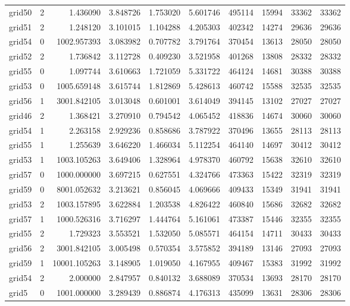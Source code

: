 \begin{longtable}{|l|r|r|r|r|r|r|r|r|r|}
grid50 & 2 & 1.436090 & 3.848726 & 1.753020 & 5.601746 & 495114 & 15994 & 33362 & 33362 \\
grid51 & 2 & 1.248120 & 3.101015 & 1.104288 & 4.205303 & 402342 & 14274 & 29636 & 29636 \\
grid54 & 0 & 1002.957393 & 3.083982 & 0.707782 & 3.791764 & 370454 & 13613 & 28050 & 28050 \\
grid52 & 2 & 1.736842 & 3.112728 & 0.409230 & 3.521958 & 401268 & 13808 & 28332 & 28332 \\
grid55 & 0 & 1.097744 & 3.610663 & 1.721059 & 5.331722 & 464124 & 14681 & 30388 & 30388 \\
grid53 & 0 & 1005.659148 & 3.615744 & 1.812869 & 5.428613 & 460742 & 15588 & 32535 & 32535 \\
grid56 & 1 & 3001.842105 & 3.013048 & 0.601001 & 3.614049 & 394145 & 13102 & 27027 & 27027 \\
grid46 & 2 & 1.368421 & 3.270910 & 0.794542 & 4.065452 & 418836 & 14674 & 30060 & 30060 \\
grid54 & 1 & 2.263158 & 2.929236 & 0.858686 & 3.787922 & 370496 & 13655 & 28113 & 28113 \\
grid55 & 1 & 1.255639 & 3.646220 & 1.466034 & 5.112254 & 464140 & 14697 & 30412 & 30412 \\
grid53 & 1 & 1003.105263 & 3.649406 & 1.328964 & 4.978370 & 460792 & 15638 & 32610 & 32610 \\
grid57 & 0 & 1000.000000 & 3.697215 & 0.627551 & 4.324766 & 473363 & 15422 & 32319 & 32319 \\
grid59 & 0 & 8001.052632 & 3.213621 & 0.856045 & 4.069666 & 409433 & 15349 & 31941 & 31941 \\
grid53 & 2 & 1003.157895 & 3.622884 & 1.203538 & 4.826422 & 460840 & 15686 & 32682 & 32682 \\
grid57 & 1 & 1000.526316 & 3.716297 & 1.444764 & 5.161061 & 473387 & 15446 & 32355 & 32355 \\
grid55 & 2 & 1.729323 & 3.553521 & 1.532050 & 5.085571 & 464154 & 14711 & 30433 & 30433 \\
grid56 & 2 & 3001.842105 & 3.005498 & 0.570354 & 3.575852 & 394189 & 13146 & 27093 & 27093 \\
grid59 & 1 & 10001.105263 & 3.148905 & 1.019050 & 4.167955 & 409467 & 15383 & 31992 & 31992 \\
grid54 & 2 & 2.000000 & 2.847957 & 0.840132 & 3.688089 & 370534 & 13693 & 28170 & 28170 \\
grid5 & 0 & 1001.000000 & 3.289439 & 0.886874 & 4.176313 & 435099 & 13631 & 28306 & 28306 \\

\end{longtable}

